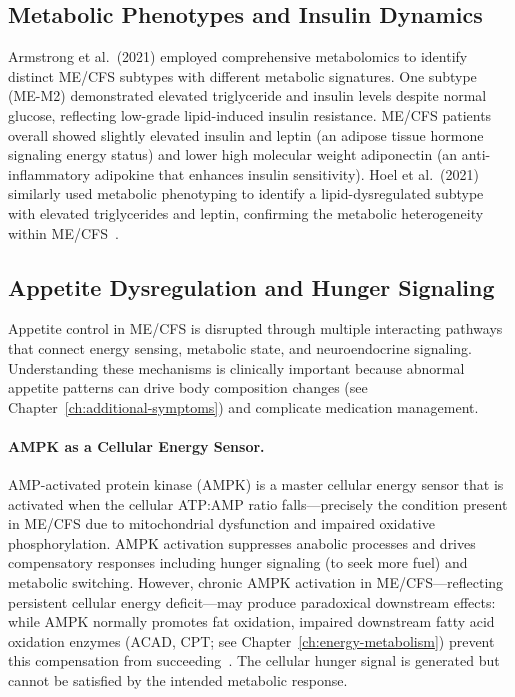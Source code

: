 \subsection{Metabolic Phenotypes and Insulin Dynamics}

Armstrong et al.\ (2021) employed comprehensive metabolomics to identify distinct ME/CFS subtypes with different metabolic signatures. One subtype (ME-M2) demonstrated elevated triglyceride and insulin levels despite normal glucose, reflecting low-grade lipid-induced insulin resistance. ME/CFS patients overall showed slightly elevated insulin and leptin (an adipose tissue hormone signaling energy status) and lower high molecular weight adiponectin (an anti-inflammatory adipokine that enhances insulin sensitivity). Hoel et al.\ (2021) similarly used metabolic phenotyping to identify a lipid-dysregulated subtype with elevated triglycerides and leptin, confirming the metabolic heterogeneity within ME/CFS~\cite{Hoel2021metabolicphenotypes}.

\subsection{Appetite Dysregulation and Hunger Signaling}

Appetite control in ME/CFS is disrupted through multiple interacting pathways that connect energy sensing, metabolic state, and neuroendocrine signaling. Understanding these mechanisms is clinically important because abnormal appetite patterns can drive body composition changes (see Chapter~\ref{ch:additional-symptoms}) and complicate medication management.

\paragraph{AMPK as a Cellular Energy Sensor.}
AMP-activated protein kinase (AMPK) is a master cellular energy sensor that is activated when the cellular ATP:AMP ratio falls---precisely the condition present in ME/CFS due to mitochondrial dysfunction and impaired oxidative phosphorylation. AMPK activation suppresses anabolic processes and drives compensatory responses including hunger signaling (to seek more fuel) and metabolic switching. However, chronic AMPK activation in ME/CFS---reflecting persistent cellular energy deficit---may produce paradoxical downstream effects: while AMPK normally promotes fat oxidation, impaired downstream fatty acid oxidation enzymes (ACAD, CPT; see Chapter~\ref{ch:energy-metabolism}) prevent this compensation from succeeding~\cite{Maya2023fattyacid}. The cellular hunger signal is generated but cannot be satisfied by the intended metabolic response.

